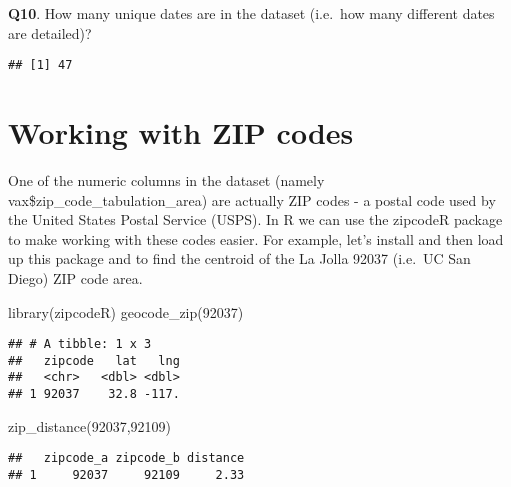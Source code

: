 \documentclass[
]{article}
\newenvironment{Shaded}{\begin{snugshade}}{\end{snugshade}}
\newcommand{\FunctionTok}[1]{\textcolor[rgb]{0.00,0.00,0.00}{#1}}
\newcommand{\NormalTok}[1]{#1}
\newcommand{\SpecialCharTok}[1]{\textcolor[rgb]{0.00,0.00,0.00}{#1}}
\newcommand{\StringTok}[1]{\textcolor[rgb]{0.31,0.60,0.02}{#1}}
\begin{document}
\textbf{Q10}. How many unique dates are in the dataset (i.e.~how many
different dates are detailed)?

\begin{Shaded}
\end{Shaded}

\begin{verbatim}
## [1] 47
\end{verbatim}

\hypertarget{working-with-zip-codes}{%
\section{Working with ZIP codes}\label{working-with-zip-codes}}

One of the numeric columns in the dataset (namely
vax\$zip\_code\_tabulation\_area) are actually ZIP codes - a postal code
used by the United States Postal Service (USPS). In R we can use the
zipcodeR package to make working with these codes easier. For example,
let's install and then load up this package and to find the centroid of
the La Jolla 92037 (i.e.~UC San Diego) ZIP code area.

\begin{Shaded}
\begin{Highlighting}[]
\FunctionTok{library}\NormalTok{(zipcodeR)}
\FunctionTok{geocode\_zip}\NormalTok{(}\StringTok{\textquotesingle{}92037\textquotesingle{}}\NormalTok{)}
\end{Highlighting}
\end{Shaded}

\begin{verbatim}
## # A tibble: 1 x 3
##   zipcode   lat   lng
##   <chr>   <dbl> <dbl>
## 1 92037    32.8 -117.
\end{verbatim}

\begin{Shaded}
\begin{Highlighting}[]
\FunctionTok{zip\_distance}\NormalTok{(}\StringTok{\textquotesingle{}92037\textquotesingle{}}\NormalTok{,}\StringTok{\textquotesingle{}92109\textquotesingle{}}\NormalTok{)}
\end{Highlighting}
\end{Shaded}

\begin{verbatim}
##   zipcode_a zipcode_b distance
## 1     92037     92109     2.33
\end{verbatim}
\end{document}
